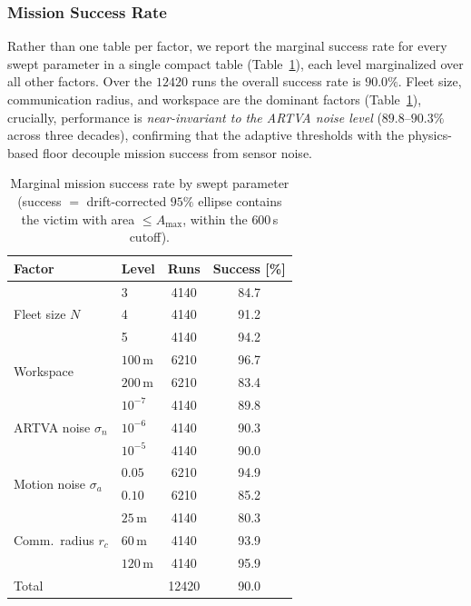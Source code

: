 \documentclass[journal,10pt,twocolumn]{IEEEtran}
\begin{document}
\subsubsection{Mission Success Rate}

Rather than one table per factor, we report the marginal success rate for
every swept parameter in a single compact table (Table~\ref{tab:success}),
each level marginalized over all other factors.  Over the $12420$ runs the
overall success rate is $90.0\%$.  Fleet size, communication radius, and
workspace are the dominant factors (Table~\ref{tab:success}), crucially,
performance is \emph{near-invariant to the ARTVA noise level}
($89.8$--$90.3\%$ across three decades), confirming that the adaptive
thresholds with the physics-based floor decouple mission success from
sensor noise.

\begin{table}[t]
  \caption{Marginal mission success rate by swept parameter
  (success $=$ drift-corrected $95\%$ ellipse contains the victim with area
  $\le A_{\max}$, within the $600$\,s cutoff).}
  \label{tab:success}
  \centering\small
  \setlength{\tabcolsep}{4pt}
  \begin{tabular}{llcc}
    \toprule
    Factor & Level & Runs & Success [\%] \\
    \midrule
    \multirow{3}{*}{Fleet size $N$}
        & 3        & 4140 & 84.7 \\
        & 4        & 4140 & 91.2 \\
        & 5        & 4140 & 94.2 \\
    \midrule
    \multirow{2}{*}{Workspace}
        & $100$\,m & 6210 & 96.7 \\
        & $200$\,m & 6210 & 83.4 \\
    \midrule
    \multirow{3}{*}{ARTVA noise $\sigma_n$}
        & $10^{-7}$ & 4140 & 89.8 \\
        & $10^{-6}$ & 4140 & 90.3 \\
        & $10^{-5}$ & 4140 & 90.0 \\
    \midrule
    \multirow{2}{*}{Motion noise $\sigma_a$}
        & $0.05$ & 6210 & 94.9 \\
        & $0.10$ & 6210 & 85.2 \\
    \midrule
    \multirow{3}{*}{Comm.\ radius $r_c$}
        & $25$\,m  & 4140 & 80.3 \\
        & $60$\,m  & 4140 & 93.9 \\
        & $120$\,m & 4140 & 95.9 \\
    \midrule
    Total & & 12420 & 90.0 \\
    \bottomrule
  \end{tabular}
\end{table}
\end{document}
